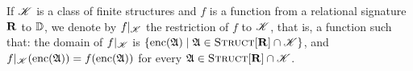 If $\mathscr{K}$ is a class of finite structures and $f$ is a function from a relational signature $\mathbf{R}$ to $\mathbb{D}$, we denote by $f|_{\mathscr{K}}$ the restriction of $f$ to $\mathscr{K}$, that is, a function such that: the domain of $f|_{\mathscr{K}}$ is $\{ {\rm enc}(\mathfrak{A}) \mid \mathfrak{A} \in \text{\sc Struct}[\mathbf{R}] \cap \mathscr{K}\}$, and 
$f|_{\mathscr{K}}({\rm enc}(\mathfrak{A})) = f({\rm enc}(\mathfrak{A}))$ for every $\mathfrak{A} \in \text{\sc Struct}[\mathbf{R}] \cap \mathscr{K}$. 

